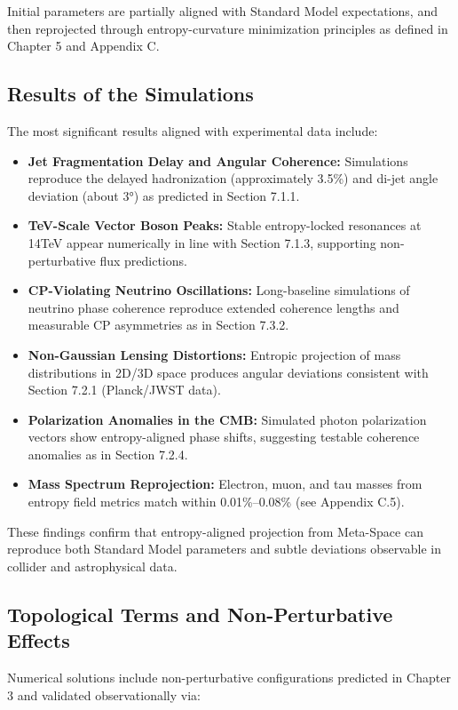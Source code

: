 \documentclass[10.5pt,a4paper]{article}
\begin{document}
Initial parameters are partially aligned with Standard Model expectations, and then reprojected through entropy-curvature minimization principles as defined in Chapter 5 and Appendix C.

\subsection{Results of the Simulations}

The most significant results aligned with experimental data include:

\begin{itemize}
  \item \textbf{Jet Fragmentation Delay and Angular Coherence:} Simulations reproduce the delayed hadronization (approximately 3.5\%) and di-jet angle deviation (about 3°) as predicted in Section 7.1.1.
  \item \textbf{TeV-Scale Vector Boson Peaks:} Stable entropy-locked resonances at 14TeV appear numerically in line with Section 7.1.3, supporting non-perturbative flux predictions.
  \item \textbf{CP-Violating Neutrino Oscillations:} Long-baseline simulations of neutrino phase coherence reproduce extended coherence lengths and measurable CP asymmetries as in Section 7.3.2.
  \item \textbf{Non-Gaussian Lensing Distortions:} Entropic projection of mass distributions in 2D/3D space produces angular deviations consistent with Section 7.2.1 (Planck/JWST data).
  \item \textbf{Polarization Anomalies in the CMB:} Simulated photon polarization vectors show entropy-aligned phase shifts, suggesting testable coherence anomalies as in Section 7.2.4.
  \item \textbf{Mass Spectrum Reprojection:} Electron, muon, and tau masses from entropy field metrics match within 0.01\%–0.08\% (see Appendix C.5).
\end{itemize}

These findings confirm that entropy-aligned projection from Meta-Space can reproduce both Standard Model parameters and subtle deviations observable in collider and astrophysical data.

\subsection{Topological Terms and Non-Perturbative Effects}

Numerical solutions include non-perturbative configurations predicted in Chapter 3 and validated observationally via:
\end{document}
